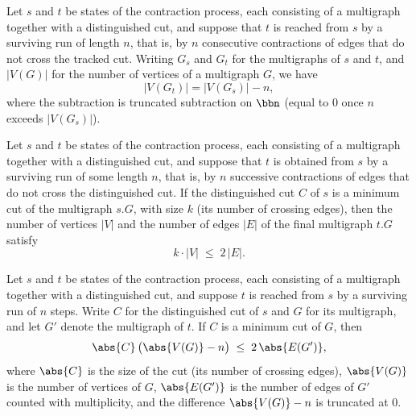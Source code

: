 \begin{lemma}
\label{KargerTrace.survivingRun_vertexCount_eq}
\leanok
{}
Let $s$ and $t$ be states of the contraction process, each consisting of a multigraph
together with a distinguished cut, and suppose that $t$ is reached from $s$ by a
surviving run of length $n$, that is, by $n$ consecutive contractions of edges that do
not cross the tracked cut. Writing $G_s$ and $G_t$ for the multigraphs of $s$ and $t$,
and $\lvert V(G)\rvert$ for the number of vertices of a multigraph $G$, we have \[
\lvert V(G_t)\rvert = \lvert V(G_s)\rvert - n, \] where the subtraction is truncated
subtraction on $\bbn$ (equal to $0$ once $n$ exceeds $\lvert V(G_s)\rvert$).
\end{lemma}

\begin{lemma}
\label{KargerTrace.survivingRun_edge_count_invariant}
\leanok
{}
Let $s$ and $t$ be states of the contraction process, each consisting of a multigraph
together with a distinguished cut, and suppose that $t$ is obtained from $s$ by a
surviving run of some length $n$, that is, by $n$ successive contractions of edges that
do not cross the distinguished cut. If the distinguished cut $C$ of $s$ is a minimum cut
of the multigraph $s.G$, with size $k$ (its number of crossing edges), then the number
of vertices $|V|$ and the number of edges $|E|$ of the final multigraph $t.G$ satisfy
\[
  k \cdot |V| \;\le\; 2\,|E|.
\]
\end{lemma}

\begin{lemma}
\label{KargerTrace.survivingRun_edge_count_invariant_indexed}
\leanok
{}
Let $s$ and $t$ be states of the contraction process, each consisting of a multigraph
together with a distinguished cut, and suppose $t$ is reached from $s$ by a surviving
run of $n$ steps. Write $C$ for the distinguished cut of $s$ and $G$ for its multigraph,
and let $G'$ denote the multigraph of $t$. If $C$ is a minimum cut of $G$, then
\[
  \abs{C}\,\bigl(\abs{V(G)} - n\bigr) \;\le\; 2\,\abs{E(G')},
\]
where $\abs{C}$ is the size of the cut (its number of crossing edges), $\abs{V(G)}$ is
the number of vertices of $G$, $\abs{E(G')}$ is the number of edges of $G'$ counted with
multiplicity, and the difference $\abs{V(G)} - n$ is truncated at $0$.
\end{lemma}

